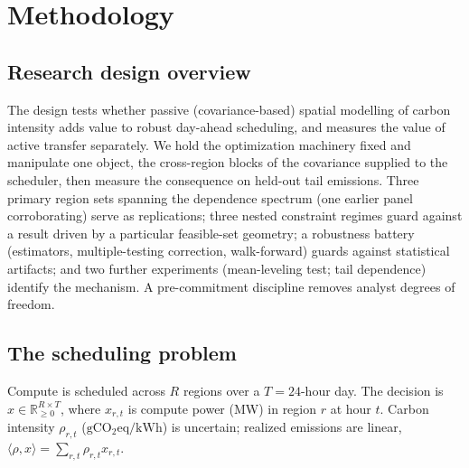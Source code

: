 \documentclass[12pt]{article}
\newcommand{\R}{\mathbb{R}}
\newcommand{\gco}{\mathrm{gCO_2eq/kWh}}
\begin{document}
\section{Methodology}\label{sec:method}

\subsection{Research design overview}
The design tests whether passive (covariance-based) spatial modelling of carbon
intensity adds value to robust day-ahead scheduling, and measures the value of active
transfer separately. We hold the optimization machinery fixed and manipulate one
object, the cross-region blocks of the covariance supplied to the scheduler, then
measure the consequence on held-out tail emissions. Three primary region sets
spanning the dependence spectrum (one earlier panel corroborating) serve as
replications; three nested constraint regimes guard against a result driven by a
particular feasible-set geometry; a robustness battery (estimators, multiple-testing
correction, walk-forward) guards against statistical artifacts; and two further
experiments (mean-leveling test; tail dependence) identify the mechanism. A
pre-commitment discipline removes analyst degrees of freedom.

\subsection{The scheduling problem}
Compute is scheduled across $R$ regions over a $T=24$-hour day. The decision is
$x\in\R^{R\times T}_{\ge0}$, where $x_{r,t}$ is compute power (MW) in region $r$ at
hour $t$. Carbon intensity $\rho_{r,t}$ ($\gco$) is uncertain; realized emissions
are linear, $\langle\rho,x\rangle=\sum_{r,t}\rho_{r,t}x_{r,t}$.
\end{document}
